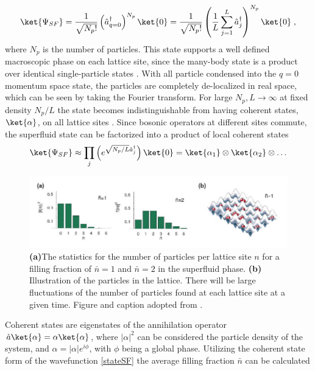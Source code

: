 \begin{equation}
	\ket{\Psi_{SF}} =  \frac{1}{\sqrt{N_{p} !}} \left( \hat{a}_{q = 0}^{\dag} \right) ^{N_{p}} \ket{0} = \frac{1}{\sqrt{N_{p} !}} \left( \frac{1}{L} \sum_{j = 1}^{L} \hat{a}_{j}^{\dag} \right) ^{N_{p}} \ket{0} \; ,
\end{equation} 
where $N_{p}$ is the number of particles. This state supports a well defined macroscopic phase on each lattice site, since the many-body state is a product over identical single-particle states \cite{greiner}. With all particle condensed into the $q = 0$ momentum space state, the particles are completely de-localized in real space, which can be seen by taking the Fourier transform. For large $N_{p} , L \rightarrow \infty$ at fixed density $N_{p}/L$ the state becomes indistinguishable from having coherent states, $\ket{\alpha} $, on all lattice sites \cite{manybodyBloch}. Since bosonic operators at different sites commute, the superfluid state can be factorized into a product of local coherent states
\begin{equation}
	\ket{\Psi_{SF}} \approx \prod_j \left( e^{\sqrt{N_p/L} \hat{a}_{j}^{\dag}} \right) \ket{0} = \ket{\alpha_1} \otimes \ket{\alpha_2} \otimes \ldots
	\label{stateSF}
\end{equation}
\begin{figure}[!h]
	\centering
	\includegraphics[width=0.8\columnwidth]{Figures/f(n)_SF.JPG} 
	\caption{\textbf{(a)}The statistics for the number of particles per lattice site $n$ for a filling fraction of $\bar{n}=1$ and $\bar{n}=2$ in the superfluid phase. \textbf{(b)} Illustration of the particles in the lattice. There will be large fluctuations of the number of particles found at each lattice site at a given time. Figure and caption adopted from \cite{greiner}.}
	\label{fig:f(n)_SF} 
\end{figure}
Coherent states are eigenstates of the annihilation operator $\hat{a} \ket{\alpha} = \alpha \ket{\alpha}$, where $|\alpha |^2$ can be considered the particle density of the system, and $\alpha = |\alpha| e^{i \phi}$, with $\phi$ being a global phase. Utilizing the coherent state form of the wavefunction \eqref{stateSF} the average filling fraction $\bar{n}$ can be calculated
